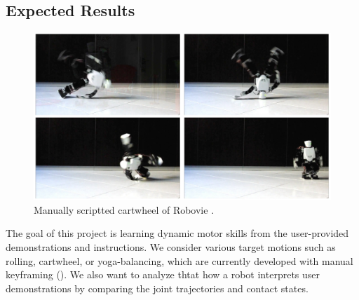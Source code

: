 \subsection{Expected Results}

\begin{figure}[htbp]
\center
  \includegraphics[width=5.0in]{images/training2_cartwheel}
  \caption{Manually scriptted cartwheel of Robovie \cite{Youtube-Robovie-X}.}
 \label{fig:cartwheel}
\end{figure}

The goal of this project is learning dynamic motor skills
from the user-provided demonstrations and instructions.
We consider various target motions 
such as rolling, cartwheel, or yoga-balancing,
which are currently developed with manual keyframing ().
We also want to analyze thtat how a robot interprets user demonstrations
by comparing the joint trajectories and contact states.


